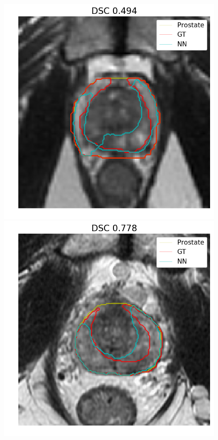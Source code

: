 \begin{figure}[h]
    \includegraphics[totalheight=.2\textheight]{figures/results/PZ_GE__GE_yes_ROI_MIN_Case-0481.png}
    \includegraphics[totalheight=.2\textheight]{figures/results/PZ_GE__GE_yes_ROI_MEAN_Case-0462.png}

\end{figure}

